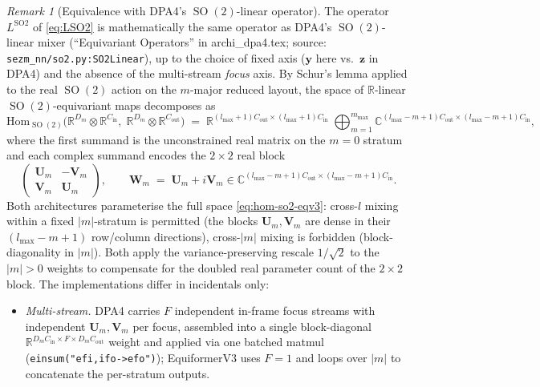 \documentclass[11pt,a4paper]{article}
\DeclareMathOperator{\SO}{SO}
\newcommand{\R}{\mathbb{R}}
\newcommand{\C}{\mathbb{C}}
\newcommand{\bU}{\bm{U}}
\newcommand{\bV}{\bm{V}}
\newcommand{\by}{\bm{y}}
\newcommand{\bz}{\bm{z}}
\newcommand{\bW}{\bm{W}}
\newcommand{\lmax}{l_{\max}}
\newcommand{\mmax}{m_{\max}}
\theoremstyle{plain}
\theoremstyle{definition}
\theoremstyle{remark}
\newtheorem{remark}[theorem]{Remark}
\begin{document}
\begin{remark}[Equivalence with DPA4's $\SO(2)$-linear operator]\label{rmk:so2-equiv}
    The operator $L^{\mathrm{SO2}}$ of \eqref{eq:LSO2} is mathematically the same operator as DPA4's $\SO(2)$-linear mixer (``Equivariant Operators'' in archi\_dpa4.tex; source: \texttt{sezm\_nn/so2.py:SO2Linear}), up to the choice of fixed axis ($\by$ here vs.\ $\bz$ in DPA4) and the absence of the multi-stream \emph{focus} axis.
    By Schur's lemma applied to the real $\SO(2)$ action on the $m$-major reduced layout, the space of $\R$-linear $\SO(2)$-equivariant maps decomposes as
    \begin{equation}\label{eq:hom-so2-eqv3}
        \mathrm{Hom}_{\SO(2)}\bigl(\R^{D_m}\otimes\R^{C_{\mathrm{in}}},\;\R^{D_m}\otimes\R^{C_{\mathrm{out}}}\bigr)
        \;=\;\R^{(\lmax+1)C_{\mathrm{out}}\times(\lmax+1)C_{\mathrm{in}}}\;\bigoplus_{m=1}^{\mmax}\C^{(\lmax-m+1)C_{\mathrm{out}}\times(\lmax-m+1)C_{\mathrm{in}}},
    \end{equation}
    where the first summand is the unconstrained real matrix on the $m=0$ stratum and each complex summand encodes the $2\times 2$ real block
    \begin{equation}\label{eq:so2-block}
        \begin{pmatrix}\bU_m & -\bV_m\\ \bV_m & \bU_m\end{pmatrix},\qquad \bW_m\;=\;\bU_m+i\bV_m\in\C^{(\lmax-m+1)C_{\mathrm{out}}\times(\lmax-m+1)C_{\mathrm{in}}}.
    \end{equation}
    Both architectures parameterise the full space \eqref{eq:hom-so2-eqv3}: cross-$l$ mixing within a fixed $|m|$-stratum is permitted (the blocks $\bU_m,\bV_m$ are dense in their $(\lmax-m+1)$ row/column directions), cross-$|m|$ mixing is forbidden (block-diagonality in $|m|$).
    Both apply the variance-preserving rescale $1/\sqrt{2}$ to the $|m|>0$ weights to compensate for the doubled real parameter count of the $2\times 2$ block.
    The implementations differ in incidentals only:
    \begin{itemize}[leftmargin=2em]
        \item \emph{Multi-stream.}
              DPA4 carries $F$ independent in-frame focus streams with independent $\bU_m,\bV_m$ per focus, assembled into a single block-diagonal $\R^{D_m C_{\mathrm{in}}\times F\times D_m C_{\mathrm{out}}}$ weight and applied via one batched matmul (\texttt{einsum("efi,ifo->efo")}); EquiformerV3 uses $F=1$ and loops over $|m|$ to concatenate the per-stratum outputs.

\end{itemize}
\end{remark}
\end{document}
